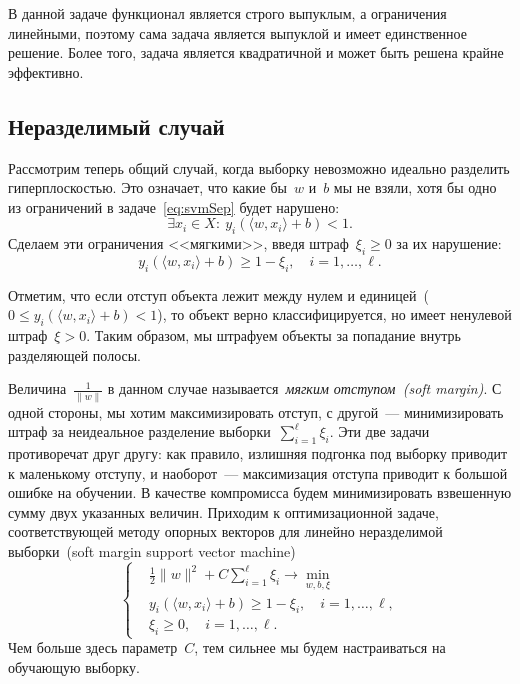 \documentclass[12pt,fleqn]{article}
\begin{document}
В данной задаче функционал является строго выпуклым, а ограничения линейными,
поэтому сама задача является выпуклой и имеет единственное решение.
Более того, задача является квадратичной и может быть решена крайне эффективно.

\subsection{Неразделимый случай}
Рассмотрим теперь общий случай, когда выборку
невозможно идеально разделить гиперплоскостью.
Это означает, что какие бы~$w$ и~$b$ мы не взяли,
хотя бы одно из ограничений в задаче~\eqref{eq:svmSep}
будет нарушено:
\[
    \exists x_i \in X:\
    y_i \left(
        \langle w, x_i \rangle + b
    \right) < 1.
\]
Сделаем эти ограничения <<мягкими>>, введя штраф~$\xi_i \geq 0$ за их нарушение:
\[
    y_i \left(
        \langle w, x_i \rangle + b
    \right) \geq 1 - \xi_i, \quad i = 1, \dots, \ell.
\]

Отметим, что если отступ объекта лежит между нулем и
единицей~($0 \leq y_i \left( \langle w, x_i \rangle + b \right) < 1$),
то объект верно классифицируется, но имеет ненулевой штраф~$\xi > 0$.
Таким образом, мы штрафуем объекты за попадание внутрь разделяющей полосы.

Величина~$\frac{1}{\|w\|}$ в данном случае называется~\emph{мягким отступом~(soft margin)}.
С одной стороны, мы хотим максимизировать отступ, с другой~--- минимизировать
штраф за неидеальное разделение выборки~$\sum_{i = 1}^{\ell} \xi_i$.
Эти две задачи противоречат друг другу: как правило, излишняя подгонка под
выборку приводит к маленькому отступу, и наоборот~--- максимизация отступа
приводит к большой ошибке на обучении.
В качестве компромисса будем минимизировать взвешенную сумму двух указанных величин.
Приходим к оптимизационной задаче,
соответствующей методу опорных векторов для линейно неразделимой выборки~(soft margin support vector machine)
\begin{equation}
\label{eq:svmUnsep}
    \left\{
        \begin{aligned}
            & \frac{1}{2} \|w\|^2 + C \sum_{i = 1}^{\ell} \xi_i \to \min_{w, b, \xi} \\
            & y_i \left(
                \langle w, x_i \rangle + b
            \right) \geq 1 - \xi_i, \quad i = 1, \dots, \ell, \\
            & \xi_i \geq 0, \quad i = 1, \dots, \ell.
        \end{aligned}
    \right.
\end{equation}
Чем больше здесь параметр~$C$, тем сильнее мы будем настраиваться на обучающую выборку.
\end{document}
